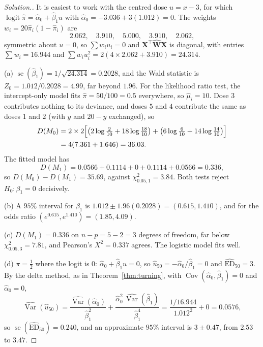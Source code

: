 \documentclass[11pt,a4paper]{article}
\numberwithin{equation}{section}
\theoremstyle{definition}
\newenvironment{solution}
  {\renewcommand{\qedsymbol}{}\begin{proof}[\textit{Solution}.]}
  {\end{proof}}
\begin{document}
\begin{solution}
It is easiest to work with the centred dose $u = x - 3$, for which $\operatorname{logit}\hat\pi = \hat\alpha_0 + \hat\beta_1u$ with
$\hat\alpha_0 = -3.036 + 3(1.012) = 0$. The weights $w_i = 20\hat\pi_i(1 - \hat\pi_i)$ are
\[
2.062, \quad 3.910, \quad 5.000, \quad 3.910, \quad 2.062 ,
\]
symmetric about $u = 0$, so $\sum w_iu_i = 0$ and $\mathbf{X}^\top\hat{\mathbf{W}}\mathbf{X}$ is diagonal, with entries
$\sum w_i = 16.944$ and $\sum w_iu_i^2 = 2(4 \times 2.062 + 3.910) = 24.314$.

(a) $\operatorname{se}(\hat\beta_1) = 1/\sqrt{24.314} = 0.2028$, and the Wald statistic is $Z_0 = 1.012/0.2028 = 4.99$, far beyond $1.96$.
For the likelihood ratio test, the intercept-only model fits $\hat\pi = 50/100 = 0.5$ everywhere, so $\hat\mu_i = 10$. Dose $3$ contributes nothing to its deviance, and doses $5$ and $4$ contribute the same as doses $1$ and $2$ (with $y$ and $20 - y$
exchanged), so
\begin{align*}
D(M_0) &= 2 \times 2\Bigl[\bigl(2\log\tfrac{2}{10} + 18\log\tfrac{18}{10}\bigr) + \bigl(6\log\tfrac{6}{10} + 14\log\tfrac{14}{10}\bigr)\Bigr] \\
&= 4(7.361 + 1.646) = 36.03 .
\end{align*} The fitted model has
\[
D(M_1) = 0.0566 + 0.1114 + 0 + 0.1114 + 0.0566 = 0.336 ,
\]
so $D(M_0) - D(M_1) = 35.69$, against $\chi^2_{0.05,1} = 3.84$. Both tests reject $H_0\colon \beta_1 = 0$ decisively.

(b) A $95\%$ interval for $\beta_1$ is $1.012 \pm 1.96(0.2028) = (0.615, 1.410)$, and for the odds ratio
$(e^{0.615}, e^{1.410}) = (1.85, 4.09)$.

(c) $D(M_1) = 0.336$ on $n - p = 5 - 2 = 3$ degrees of freedom, far below $\chi^2_{0.05,3} = 7.81$, and Pearson's $X^2 = 0.337$
agrees. The logistic model fits well.

(d) $\pi = \frac12$ where the logit is $0$: $\hat\alpha_0 + \hat\beta_1u = 0$, so $\hat u_{50} = -\hat\alpha_0/\hat\beta_1 = 0$ and $\widehat{\mathrm{ED}}_{50} = 3$. By the
delta method, as in Theorem~\ref{thm:turning}, with $\operatorname{Cov}(\hat\alpha_0, \hat\beta_1) = 0$ and $\hat\alpha_0 = 0$,
\[
\widehat{\operatorname{Var}}(\hat u_{50}) = \frac{\widehat{\operatorname{Var}}(\hat\alpha_0)}{\hat\beta_1^2} + \frac{\hat\alpha_0^2\,\widehat{\operatorname{Var}}(\hat\beta_1)}{\hat\beta_1^4}
= \frac{1/16.944}{1.012^2} + 0 = 0.0576 ,
\]
so $\operatorname{se}(\widehat{\mathrm{ED}}_{50}) = 0.240$, and an approximate $95\%$ interval is $3 \pm 0.47$, from $2.53$ to $3.47$.
\end{solution}
\end{document}
